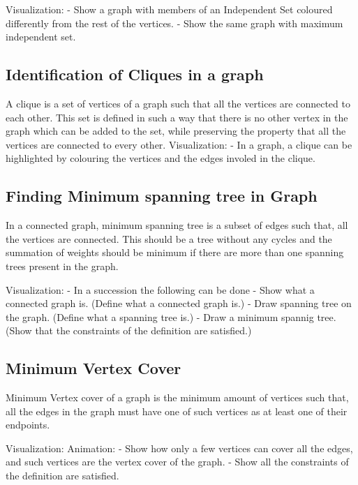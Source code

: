 Visualization: - Show a graph with members of an Independent Set
coloured differently from the rest of the vertices. - Show the same
graph with maximum independent set.

\hypertarget{identification-of-cliques-in-a-graph}{%
\subsection{Identification of Cliques in a
graph}\label{identification-of-cliques-in-a-graph}}

A clique is a set of vertices of a graph such that all the vertices are
connected to each other. This set is defined in such a way that there is
no other vertex in the graph which can be added to the set, while
preserving the property that all the vertices are connected to every
other. Visualization: - In a graph, a clique can be highlighted by
colouring the vertices and the edges involed in the clique.

\hypertarget{finding-minimum-spanning-tree-in-graph}{%
\subsection{Finding Minimum spanning tree in
Graph}\label{finding-minimum-spanning-tree-in-graph}}

In a connected graph, minimum spanning tree is a subset of edges such
that, all the vertices are connected. This should be a tree without any
cycles and the summation of weights should be minimum if there are more
than one spanning trees present in the graph.

Visualization: - In a succession the following can be done - Show what a
connected graph is. (Define what a connected graph is.) - Draw spanning
tree on the graph. (Define what a spanning tree is.) - Draw a minimum
spannig tree. (Show that the constraints of the definition are
satisfied.)

\hypertarget{minimum-vertex-cover}{%
\subsection{Minimum Vertex Cover}\label{minimum-vertex-cover}}

Minimum Vertex cover of a graph is the minimum amount of vertices such
that, all the edges in the graph must have one of such vertices as at
least one of their endpoints.

Visualization: Animation: - Show how only a few vertices can cover all
the edges, and such vertices are the vertex cover of the graph. - Show
all the constraints of the definition are satisfied.

